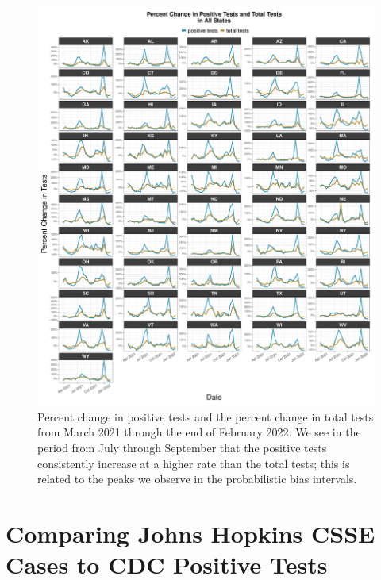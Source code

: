 \documentclass[12pt,twoside]{smiththesis}
\begin{document}
\begin{figure}

{\centering \includegraphics[width=1\linewidth]{figure/test_capacity_all_states} 

}

\caption{\label{fig:test-capacity-all-states} Percent change in positive tests and the percent change in total tests from March 2021 through the end of February 2022. We see in the period from July through September that the positive tests consistently increase at a higher rate than the total tests; this is related to the peaks we observe in the probabilistic bias intervals.}\label{fig:unnamed-chunk-109}
\end{figure}
\hypertarget{comparing-johns-hopkins-csse-cases-to-cdc-positive-tests}{%
\section{Comparing Johns Hopkins CSSE Cases to CDC Positive Tests}\label{comparing-johns-hopkins-csse-cases-to-cdc-positive-tests}}
\end{document}

